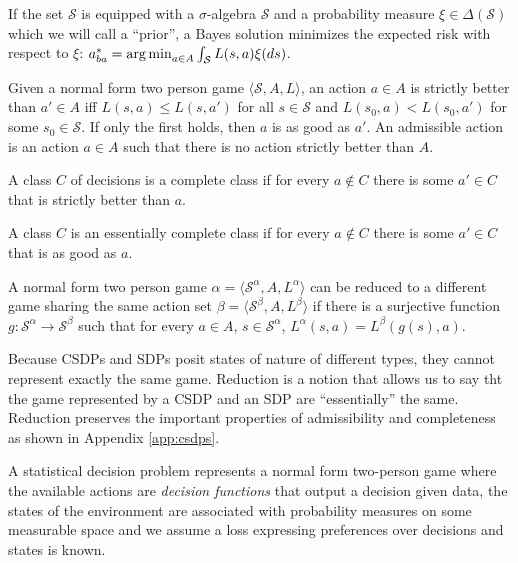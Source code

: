 If the set $\mathscr{S}$ is equipped with a $\sigma$-algebra $\mathcal{S}$ and a probability measure $\xi\in \Delta(\mathcal{S})$ which we will call a ``prior'', a Bayes solution minimizes the expected risk with respect to $\xi$: $a^*_{ba} = \operatorname*{arg\,min}_{a\in A} \int_{\mathcal{S}} L(s,a) \xi(ds)$.

\begin{definition}
Given a normal form two person game $\langle \mathscr{S}, A, L\rangle$, an action $a\in A$ is strictly better than $a'\in A$ iff $L(s,a)\leq L(s,a')$ for all $s\in\mathscr{S}$ and $L(s_0,a)<L(s_0,a')$ for some $s_0\in \mathscr{S}$. If only the first holds, then $a$ is as good as $a'$. An admissible action is an action $a\in A$ such that there is no action strictly better than $A$.
\end{definition}

\begin{definition}
A class $C$ of decisions is a complete class if for every $a\not\in C$ there is some $a'\in C$ that is strictly better than $a$.

A class $C$ is an essentially complete class if for every $a\not\in C$ there is some $a'\in C$ that is as good as $a$.
\end{definition}

\begin{definition}[Reduction]\label{def:red_sdp_CSDP}
A normal form two person game $\alpha = \langle \mathscr{S}^\alpha, A, L^\alpha\rangle$ can be reduced to a different game sharing the same action set $\beta = \langle \mathscr{S}^\beta, A, L^\beta \rangle$ if there is a surjective function $g:\mathscr{S}^\alpha\to \mathscr{S}^\beta$ such that for every $a\in A$, $s\in \mathscr{S}^\alpha$, $L^\alpha(s,a) = L^\beta(g(s),a)$.
\end{definition}

Because CSDPs and SDPs posit states of nature of different types, they cannot represent exactly the same game. Reduction is a notion that allows us to say tht the game represented by a CSDP and an SDP are ``essentially'' the same. Reduction preserves the important properties of admissibility and completeness as shown in Appendix \ref{app:csdps}.

A statistical decision problem represents a normal form two-person game where the available actions are \emph{decision functions} that output a decision given data, the states of the environment are associated with probability measures on some measurable space and we assume a loss expressing preferences over decisions and states is known.

